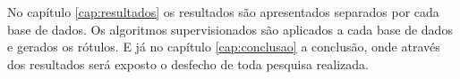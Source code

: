 No capítulo \ref{cap:resultados} os resultados são apresentados separados por cada base de dados. Os algoritmos supervisionados são aplicados a cada base de dados e gerados os rótulos. 
E já no capítulo \ref{cap:conclusao} a conclusão, onde através dos resultados será exposto o desfecho de toda pesquisa realizada.




